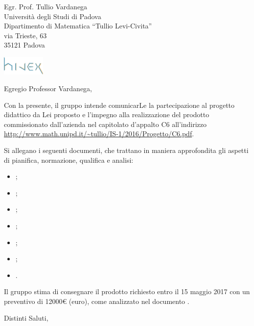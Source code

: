 \documentclass[a4paper]{letter} %
\date{Padova, \today}
\begin{document}
\begin{letter}{Egr. Prof. Tullio Vardanega\\
Università degli Studi di Padova\\
Dipartimento di Matematica “Tullio Levi-Civita”\\
via Trieste, 63\\
35121 Padova}

\includegraphics[width=80px]{../../util/hivex_logo3.png}

\opening{Egregio Professor Vardanega,}

Con la presente, il gruppo \hx{} intende comunicarLe la partecipazione al progetto didattico da Lei proposto e l'impegno alla realizzazione del prodotto \proj{} commissionato dall'azienda \ZU{} nel capitolato d'appalto C6 all'indirizzo \url{http://www.math.unipd.it/~tullio/IS-1/2016/Progetto/C6.pdf}.

Si allegano i seguenti documenti, che trattano in maniera approfondita gli aspetti di pianifica, normazione, qualifica e analisi:
\begin{itemize}
	\item \SdF;
	\item \NdP;
	\item \PdP;
	\item \PdQ;
	\item \AdR;
	\item \Glossario;
	\item \Verbali.
\end{itemize}

Il gruppo \hx{} stima di consegnare il prodotto richiesto entro il 15 maggio 2017 con un preventivo di \num{12000}\euro{} (euro), come analizzato nel documento \PdP.

\closing{Distinti Saluti,}

\end{letter}
\end{document}
